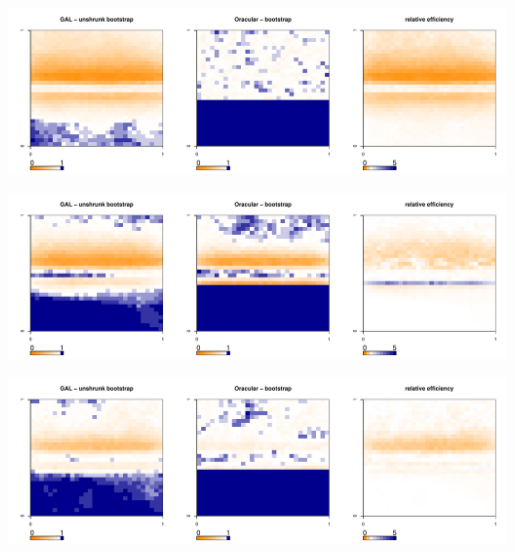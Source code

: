 	\begin{center}
		\includegraphics[width=0.99\textwidth]{../../figures/X1-28-3.pdf}
	\end{center}
	
	\begin{center}
		\includegraphics[width=0.99\textwidth]{../../figures/X1-28-4.pdf}
	\end{center}
        
	\begin{center}
		\includegraphics[width=0.99\textwidth]{../../figures/X1-28-5.pdf}
		\label{fig:coveragemap5}
	\end{center}
	
